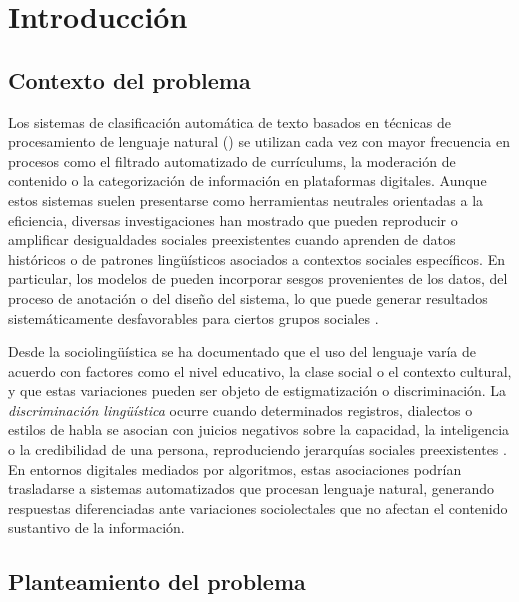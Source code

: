 \chapter{Introducción}
\label{cap:introduccion}

\section{Contexto del problema}
\label{sec:contexto}

Los sistemas de clasificación automática de texto basados en técnicas de
procesamiento de lenguaje natural (\PLN) se utilizan cada vez con mayor
frecuencia en procesos como el filtrado automatizado de currículums, la
moderación de contenido o la categorización de información en plataformas
digitales. Aunque estos sistemas suelen presentarse como herramientas neutrales
orientadas a la eficiencia, diversas investigaciones han mostrado que pueden
reproducir o amplificar desigualdades sociales preexistentes cuando aprenden
de datos históricos o de patrones lingüísticos asociados a contextos sociales
específicos. En particular, los modelos de \PLN pueden incorporar sesgos
provenientes de los datos, del proceso de anotación o del diseño del sistema,
lo que puede generar resultados sistemáticamente desfavorables para ciertos
grupos sociales \cite{HovySpruit2016,HovyPrabhumoye2021}.

Desde la sociolingüística se ha documentado que el uso del lenguaje varía de
acuerdo con factores como el nivel educativo, la clase social o el contexto
cultural, y que estas variaciones pueden ser objeto de estigmatización o
discriminación. La \emph{discriminación lingüística} ocurre cuando determinados
registros, dialectos o estilos de habla se asocian con juicios negativos sobre
la capacidad, la inteligencia o la credibilidad de una persona, reproduciendo
jerarquías sociales preexistentes \cite{Drozdzowicz2024,Weissler2022}. En
entornos digitales mediados por algoritmos, estas asociaciones podrían
trasladarse a sistemas automatizados que procesan lenguaje natural, generando
respuestas diferenciadas ante variaciones sociolectales que no afectan el
contenido sustantivo de la información.

\section{Planteamiento del problema}
\label{sec:planteamiento}

